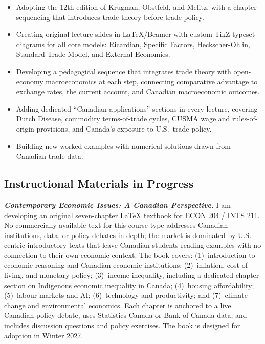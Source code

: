 \documentclass[11pt,letterpaper]{article}
\begin{document}
\begin{itemize}
  \item Adopting the 12th edition of Krugman, Obstfeld, and Melitz, with a chapter sequencing that introduces trade theory before trade policy.
  \item Creating original lecture slides in \LaTeX/Beamer with custom TikZ-typeset diagrams for all core models: Ricardian, Specific Factors, Heckscher-Ohlin, Standard Trade Model, and External Economies.
  \item Developing a pedagogical sequence that integrates trade theory with open-economy macroeconomics at each step, connecting comparative advantage to exchange rates, the current account, and Canadian macroeconomic outcomes.
  \item Adding dedicated ``Canadian applications'' sections in every lecture, covering Dutch Disease, commodity terms-of-trade cycles, CUSMA wage and rules-of-origin provisions, and Canada's exposure to U.S.\ trade policy.
  \item Building new worked examples with numerical solutions drawn from Canadian trade data.
\end{itemize}

\subsection{Instructional Materials in Progress}

\textbf{\textit{Contemporary Economic Issues: A Canadian Perspective.}} I am developing an original seven-chapter \LaTeX{} textbook for ECON 204 / INTS 211. No commercially available text for this course type addresses Canadian institutions, data, or policy debates in depth; the market is dominated by U.S.-centric introductory texts that leave Canadian students reading examples with no connection to their own economic context. The book covers: (1)~introduction to economic reasoning and Canadian economic institutions; (2)~inflation, cost of living, and monetary policy; (3)~income inequality, including a dedicated chapter section on Indigenous economic inequality in Canada; (4)~housing affordability; (5)~labour markets and AI; (6)~technology and productivity; and (7)~climate change and environmental economics. Each chapter is anchored to a live Canadian policy debate, uses Statistics Canada or Bank of Canada data, and includes discussion questions and policy exercises. The book is designed for adoption in Winter 2027.
\end{document}
